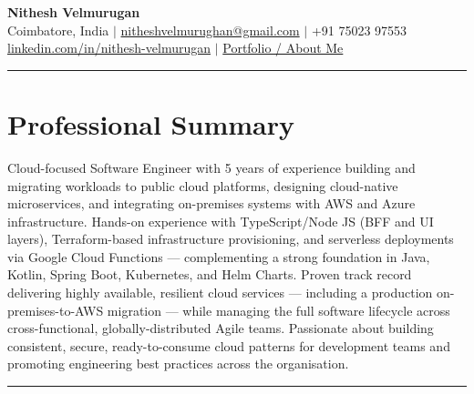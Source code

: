 \documentclass[a4paper,10pt]{article}
\newcommand{\sectionline}{\vspace{-0.1em}\noindent\rule{\linewidth}{0.6pt}\vspace{-0.7em}}
\begin{document}
\begin{center}
  \textbf{\LARGE Nithesh Velmurugan} \\[3pt]
  Coimbatore, India \quad $\vert$ \quad \href{mailto:nitheshvelmurughan@gmail.com}{nitheshvelmurughan@gmail.com} \quad $\vert$ \quad +91 75023 97553 \\[3pt]
  \href{https://linkedin.com/in/nithesh-velmurugan}{linkedin.com/in/nithesh-velmurugan} \quad $\vert$ \quad \href{https://nithesh-dev.github.io/about/}{Portfolio / About Me}
\end{center}

\vspace{-1em}

\sectionline
\section*{Professional Summary}
Cloud-focused Software Engineer with 5 years of experience building and migrating workloads to public cloud platforms, designing cloud-native microservices, and integrating on-premises systems with AWS and Azure infrastructure. Hands-on experience with TypeScript/Node JS (BFF and UI layers), Terraform-based infrastructure provisioning, and serverless deployments via Google Cloud Functions — complementing a strong foundation in Java, Kotlin, Spring Boot, Kubernetes, and Helm Charts. Proven track record delivering highly available, resilient cloud services — including a production on-premises-to-AWS migration — while managing the full software lifecycle across cross-functional, globally-distributed Agile teams. Passionate about building consistent, secure, ready-to-consume cloud patterns for development teams and promoting engineering best practices across the organisation.

\sectionline
\end{document}
